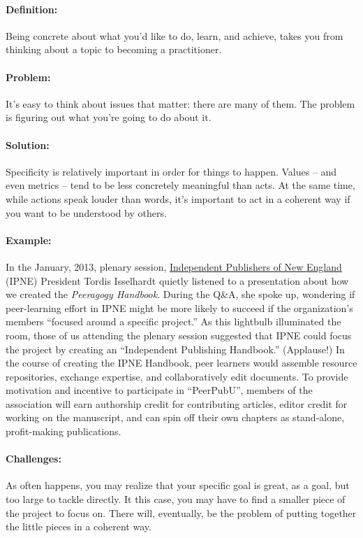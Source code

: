 \paragraph{Definition:} Being concrete about what you'd like to do, learn,
and achieve, takes you from thinking about a topic to becoming a
practitioner.

\paragraph{Problem:} It's easy to think about issues that matter: there are
many of them. The problem is figuring out what you're going to do about
it.

\paragraph{Solution:} Specificity is relatively important in order for
things to happen. Values -- and even metrics -- tend to be less
concretely meaningful than acts. At the same time, while actions speak
louder than words, it's important to act in a coherent way if you want
to be understood by others.

\paragraph{Example:} In the January, 2013, plenary
session, \href{http://ipne.org}{Independent Publishers of New England}
(IPNE) President Tordis Isselhardt quietly listened to a presentation
about how we created the \emph{Peeragogy Handbook}. During the Q\&A, she
spoke up, wondering if peer-learning effort in IPNE might be more likely
to succeed if the organization's members ``focused around a specific
project.'' As this lightbulb illuminated the room, those of us attending
the plenary session suggested that IPNE could focus the project by
creating an ``Independent Publishing Handbook.'' (Applause!) In the
course of creating the IPNE Handbook, peer learners would assemble
resource repositories, exchange expertise, and collaboratively edit
documents. To provide motivation and incentive to participate in
``PeerPubU'', members of the association will earn authorship credit for
contributing articles, editor credit for working on the manuscript, and
can spin off their own chapters as stand-alone, profit-making
publications.

\paragraph{Challenges:} As often happens, you may realize that your
specific goal is great, as a goal, but too large to tackle directly. It
this case, you may have to find a smaller piece of the project to focus
on. There will, eventually, be the problem of putting together the
little pieces in a coherent way.

